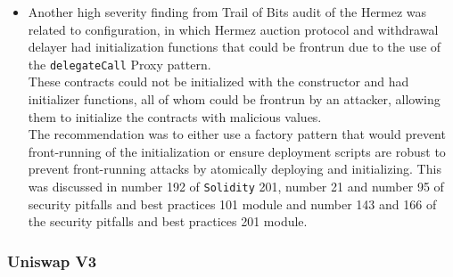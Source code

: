 \begin{itemize}
\item
  Another high severity finding from Trail of Bits audit of the Hermez
  was related to configuration, in which Hermez auction protocol and
  withdrawal delayer had initialization functions that could be frontrun
  due to the use of the \texttt{delegateCall} Proxy pattern.\\

  These contracts could not be initialized with the constructor and had
  initializer functions, all of whom could be frontrun by an attacker,
  allowing them to initialize the contracts with malicious values.\\

  The recommendation was to either use a factory pattern that would
  prevent front-running of the initialization or ensure deployment
  scripts are robust to prevent front-running attacks by atomically
  deploying and initializing. This was discussed in number 192 of
  \texttt{Solidity} 201, number 21 and number 95 of security pitfalls
  and best practices 101 module and number 143 and 166 of the security
  pitfalls and best practices 201 module.
\end{itemize}

\subsubsection{Uniswap V3}\label{uniswap-v3}

